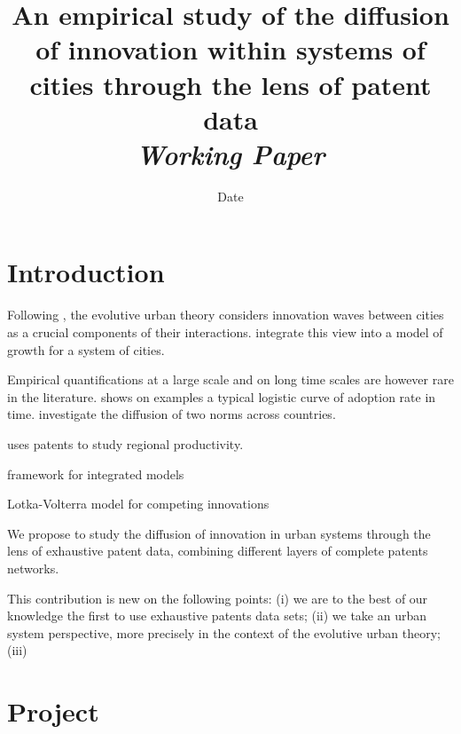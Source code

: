 


\title{An empirical study of the diffusion of innovation within systems of cities through the lens of patent data\bigskip\\
\textit{Working Paper}
}
\author{}
\date{Date}


\maketitle

\justify


\begin{abstract}

\end{abstract}




\section{Introduction}

Following \cite{hagerstrand1968innovation}, the evolutive urban theory considers innovation waves between cities as a crucial components of their interactions. \cite{favaro2011gibrat} integrate this view into a model of growth for a system of cities.

Empirical quantifications at a large scale and on long time scales are however rare in the literature. \cite{grubler1996time} shows on examples a typical logistic curve of adoption rate in time. \cite{albuquerque2007spatiotemporal} investigate the diffusion of two norms across countries.

\cite{acs2002patents} uses patents to study regional productivity.

\cite{wejnert2002integrating} framework for integrated models

\cite{sonis1983spatio} Lotka-Volterra model for competing innovations

We propose to study the diffusion of innovation in urban systems through the lens of exhaustive patent data, combining different layers of complete patents networks.

This contribution is new on the following points: (i) we are to the best of our knowledge the first to use exhaustive patents data sets; (ii) we take an urban system perspective, more precisely in the context of the evolutive urban theory; (iii)


\section{Project}

